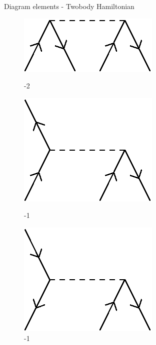     
\begin{frame}{Diagram elements - Twobody Hamiltonian}

    \renewcommand{\figurename}{Level}

    \begin{figure}
    \centering
    \parbox{0.30\textwidth}{
            \centering
            \includegraphics[scale=0.45]{graphics/v1}
            \caption{-2}
        }\quad
        \parbox{0.30\textwidth}{
            \centering
            \includegraphics[scale=0.45]{graphics/v2}
            \caption{-1}
        }\quad
        \parbox{0.30\textwidth}{
            \centering
            \includegraphics[scale=0.45]{graphics/v3}
            \caption{-1}
        }
    \end{figure}


\end{frame}
